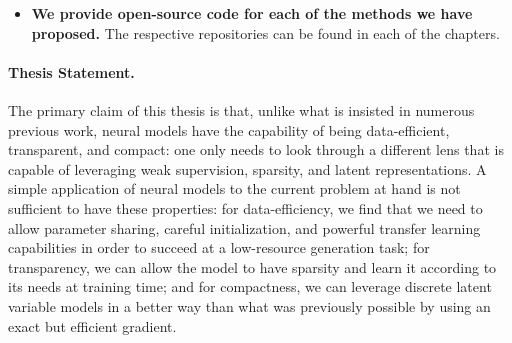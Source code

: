 \begin{itemize}
      \item \textbf{We provide open-source code for each of the
                  methods we have proposed.}
            The respective repositories can be found in each
            of the chapters.


\end{itemize}

\paragraph{Thesis Statement.} The primary claim of this thesis is
that, unlike what is insisted in numerous previous work, neural
models have the capability of being data-efficient, transparent, and
compact: one only needs to look through a different lens that is
capable of leveraging weak supervision, sparsity, and latent
representations. A simple application of neural models to the current
problem at hand is not sufficient to have these properties: for
data-efficiency, we find that we need to allow parameter sharing,
careful initialization, and powerful transfer learning capabilities
in order to succeed at a low-resource generation task; for
transparency, we can allow the model to have sparsity and learn it
according to its needs at training time; and for compactness, we can
leverage discrete latent variable models in a better way than what
was previously possible by using an exact but efficient gradient.
